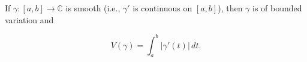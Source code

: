 If $\gamma: [a, b] \to \mathbb{C}$ is smooth (i.e., $\gamma'$ is continuous on $[a, b]$), then $\gamma$ is of bounded variation and

$$V(\gamma) = \int_{a}^{b} |\gamma'(t)| \, dt.$$
